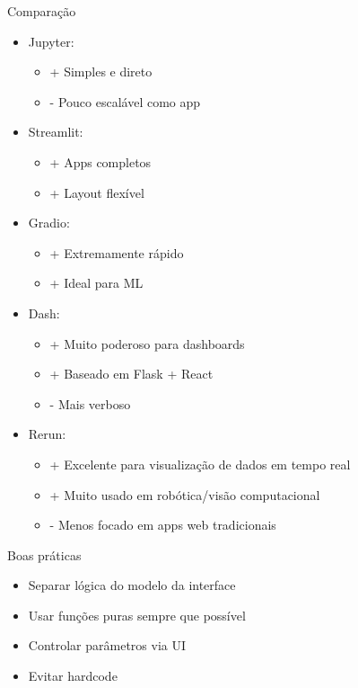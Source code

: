 \documentclass{beamer}
\begin{document}
\begin{frame}{Comparação}
\begin{itemize}
    \item Jupyter:
    \begin{itemize}
        \item + Simples e direto
        \item - Pouco escalável como app
    \end{itemize}

    \item Streamlit:
    \begin{itemize}
        \item + Apps completos
        \item + Layout flexível
    \end{itemize}

    \item Gradio:
    \begin{itemize}
        \item + Extremamente rápido
        \item + Ideal para ML
    \end{itemize}

    \item Dash:
    \begin{itemize}
        \item + Muito poderoso para dashboards
        \item + Baseado em Flask + React
        \item - Mais verboso
    \end{itemize}

    \item Rerun:
    \begin{itemize}
        \item + Excelente para visualização de dados em tempo real
        \item + Muito usado em robótica/visão computacional
        \item - Menos focado em apps web tradicionais
    \end{itemize}

\end{itemize}
\end{frame}

\begin{frame}{Boas práticas}
\begin{itemize}
    \item Separar lógica do modelo da interface
    \item Usar funções puras sempre que possível
    \item Controlar parâmetros via UI
    \item Evitar hardcode
\end{itemize}
\end{frame}
\end{document}
